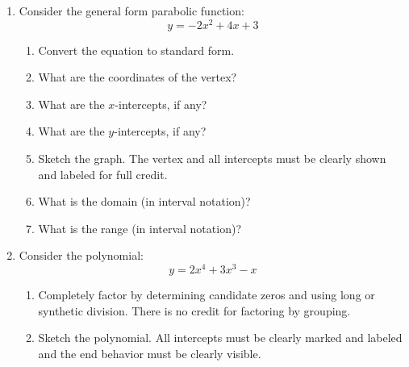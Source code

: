 \documentclass[letterpaper,12pt,fleqn]{article}
\begin{document}
\begin{enumerate}[left=0pt]
  \newpage

\item Consider the general form parabolic function:
  \[y=-2x^2+4x+3\]
  \begin{enumerate}
  \item Convert the equation to standard form.
    \vspace{4in}
  \item What are the coordinates of the vertex?
    \vspace{1in}
  \item What are the \(x\)-intercepts, if any?
    \newpage
  \item What are the \(y\)-intercepts, if any?
    \vspace{1in}
  \item Sketch the graph.  The vertex and all intercepts must be clearly shown and labeled for full credit.

    \bigskip

    
    \bigskip

  \item What is the domain (in interval notation)?
    \vspace{1in}
  \item What is the range (in interval notation)?
  \end{enumerate}

  \newpage

\item Consider the polynomial:
  \[y=2x^4+3x^3-x\]
  \begin{enumerate}
  \item Completely factor by determining candidate zeros and using long or synthetic division.  There is no credit
    for factoring by grouping.
    \newpage
  \item Sketch the polynomial.  All intercepts must be clearly marked and labeled and the end behavior must be clearly
    visible.

    \bigskip

    
    \bigskip


\end{enumerate}
\end{enumerate}
\end{document}
